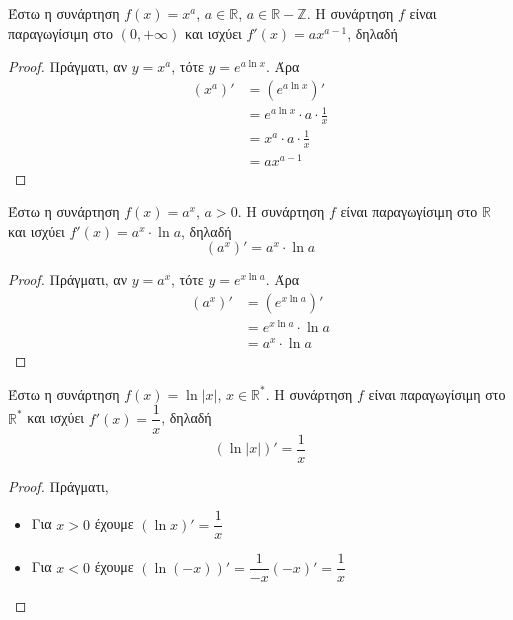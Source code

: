 \documentclass[a4paper, 12pt]{article}
\begin{document}
\begin{theorem}{}
  Έστω η συνάρτηση $f(x)=x^a$, $a\in\mathbb{R}$, $a\in\mathbb{R}-\mathbb{Z}$. Η συνάρτηση $f$ είναι παραγωγίσιμη στο $(0,+\infty)$ και ισχύει $f'(x)=ax^{a-1}$, δηλαδή
\end{theorem}
\begin{proof}
  Πράγματι, αν $y=x^a$, τότε $y=e^{a\ln x}$. Άρα
  \begin{align*}
    (x^a)' & =\left( e^{a\ln x} \right)'         \\
           & =e^{a\ln x}\cdot a\cdot \frac{1}{x} \\
           & =x^a\cdot a\cdot \frac{1}{x}        \\
           & =ax^{a-1}
  \end{align*}
\end{proof}

\begin{theorem}{}
  Έστω η συνάρτηση $f(x)=a^x$, $a>0$. Η συνάρτηση $f$ είναι παραγωγίσιμη στο $\mathbb{R}$ και ισχύει $f'(x)=a^x\cdot \ln a$, δηλαδή
  $$(a^x)'=a^x\cdot \ln a$$
\end{theorem}
\begin{proof}
  Πράγματι, αν $y=a^x$, τότε $y=e^{x\ln a}$. Άρα
  \begin{align*}
    (a^x)' & =\left( e^{x\ln a} \right)' \\
           & =e^{x\ln a}\cdot \ln a      \\
           & =a^x\cdot \ln a
  \end{align*}
\end{proof}

\begin{theorem}{}
  Έστω η συνάρτηση $f(x)=\ln |x|$, $x\in\mathbb{R}^*$. Η συνάρτηση $f$ είναι παραγωγίσιμη στο $\mathbb{R}^*$ και ισχύει $f'(x)=\dfrac{1}{x}$, δηλαδή
  $$(\ln |x|)'=\frac{1}{x}$$
\end{theorem}
\begin{proof}
  Πράγματι,
  \begin{itemize}
    \item Για $x>0$ έχουμε $(\ln x)' =\dfrac{1}{x}$
    \item Για $x<0$ έχουμε $(\ln (-x))' =\dfrac{1}{-x}(-x)'=\dfrac{1}{x}$
  \end{itemize}
\end{proof}
\end{document}

